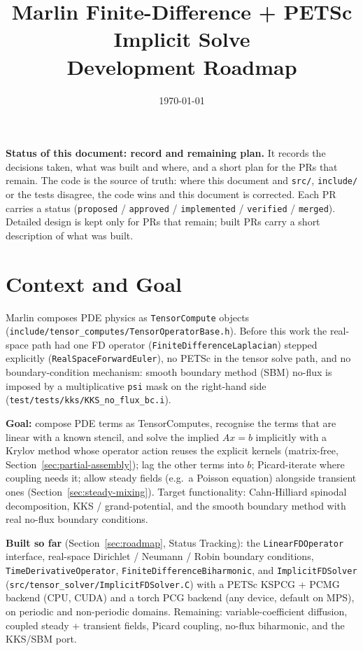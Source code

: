 \documentclass[11pt]{article}
\title{\textcolor{marlinblue}{\Huge Marlin Finite-Difference + PETSc\\[2pt] Implicit Solve}\\[8pt]
\Large Development Roadmap}
\author{}
\date{\today}
\begin{document}
\maketitle

\begin{tcolorbox}[colback=lightgray, colframe=marlinblue, boxrule=0.6pt, arc=1mm]
\textbf{Status of this document: record and remaining plan.} It records the
decisions taken, what was built and where, and a short plan for the PRs that
remain. The code is the source of truth: where this document and
\texttt{src/}, \texttt{include/} or the tests disagree, the code wins and this
document is corrected. Each PR carries a status (\texttt{proposed} /
\texttt{approved} / \texttt{implemented} / \texttt{verified} / \texttt{merged}).
Detailed design is kept only for PRs that remain; built PRs carry a short
description of what was built.
\end{tcolorbox}

\tableofcontents
\vspace{1em}

\section{Context and Goal}

Marlin composes PDE physics as \texttt{TensorCompute} objects
(\texttt{include/tensor\_computes/TensorOperatorBase.h}). Before this work the
real-space path had one FD operator (\texttt{FiniteDifferenceLaplacian})
stepped explicitly (\texttt{RealSpaceForwardEuler}), no PETSc in the tensor
solve path, and no boundary-condition mechanism: smooth boundary method (SBM)
no-flux is imposed by a multiplicative \texttt{psi} mask on the right-hand
side (\texttt{test/tests/kks/KKS\_no\_flux\_bc.i}).

\textbf{Goal:} compose PDE terms as TensorComputes, recognise the terms that
are linear with a known stencil, and solve the implied $Ax=b$ implicitly with
a Krylov method whose operator action reuses the explicit kernels
(matrix-free, Section~\ref{sec:partial-assembly}); lag the other terms into
$b$; Picard-iterate where coupling needs it; allow steady fields (e.g.\ a
Poisson equation) alongside transient ones (Section~\ref{sec:steady-mixing}).
Target functionality: Cahn-Hilliard spinodal decomposition, KKS /
grand-potential, and the smooth boundary method with real no-flux boundary
conditions.

\textbf{Built so far} (Section~\ref{sec:roadmap}, Status Tracking): the
\texttt{LinearFDOperator} interface, real-space Dirichlet / Neumann / Robin
boundary conditions, \texttt{TimeDerivativeOperator},
\texttt{FiniteDifferenceBiharmonic}, and \texttt{ImplicitFDSolver}
(\texttt{src/tensor\_solver/ImplicitFDSolver.C}) with a PETSc KSPCG + PCMG
backend (CPU, CUDA) and a torch PCG backend (any device, default on MPS), on
periodic and non-periodic domains. Remaining: variable-coefficient diffusion,
coupled steady + transient fields, Picard coupling, no-flux biharmonic, and
the KKS/SBM port.
\end{document}
